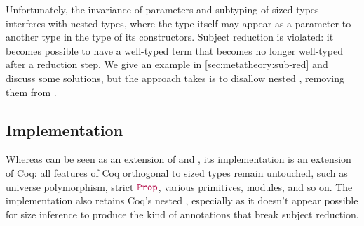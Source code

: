 Unfortunately, the invariance of parameters and subtyping of sized \coinductive types interferes with nested \coinductive types,
where the type itself may appear as a parameter to another type in the type of its constructors.
Subject reduction is violated: it becomes possible to have a well-typed term that becomes no longer well-typed after a reduction step.
We give an example in \autoref{sec:metatheory:sub-red} and discuss some solutions,
but the approach \lang takes is to disallow nested \coinductives,
removing them from \CIChat.

\iffalse
\subsection{Position Size Annotations}

Although users are not required to indicate the recursive argument when writing fixpoints in Coq,
they are indicated in the core calculus because Coq's type checker will attempt determine which one it is when not explicitly indicated.
This tells the guard predicate which argument should be checked for structural smallerness.
Similarly, \lang has position annotations to indicate which argument is the recursive argument and whether the \cofixpoint preserves sizes or not,
but they are entirely determined during size inference.
This augments the inference algorithm for \CIChat,
which assumes that the annotations are already present.

Note that while inference begins with terms whose position annotations are absent,
we do assume that the recursive arguments are already indicated,
separating what Coq already does from what there is to do to obtain sized types.
In terms of the implementation, one downside of this approach is that not as many programs that \emph{could} pass type checking \emph{do},
due to the existing architecture of the Coq type checker.
We discuss this further in \autoref{sec:impl:recind}.
\fi

\subsection{Implementation}

Whereas \lang can be seen as an extension of \CIChat and \CChatomega,
its implementation is an extension of Coq:
all features of Coq orthogonal to sized types remain untouched,
such as universe polymorphism, strict $\Prop$, various primitives, modules, and so on.
The implementation also retains Coq's nested \coinductives,
especially as it doesn't appear possible for size inference to produce the kind of annotations that break subject reduction.

